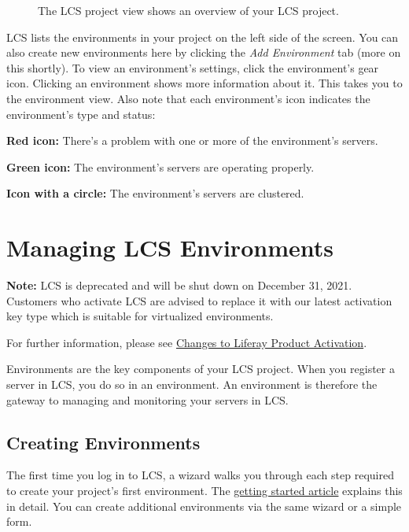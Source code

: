 \begin{figure}
\centering
{}
\caption{The LCS project view shows an overview of your LCS project.}
\end{figure}

LCS lists the environments in your project on the left side of the
screen. You can also create new environments here by clicking the
\emph{Add Environment} tab (more on this shortly). To view an
environment's settings, click the environment's gear icon. Clicking an
environment shows more information about it. This takes you to the
environment view. Also note that each environment's icon indicates the
environment's type and status:

\textbf{Red icon:} There's a problem with one or more of the
environment's servers.

\textbf{Green icon:} The environment's servers are operating properly.

\textbf{Icon with a circle:} The environment's servers are clustered.

\chapter{Managing LCS Environments}\label{managing-lcs-environments}

\noindent\hrulefill

\textbf{Note:} LCS is deprecated and will be shut down on December 31,
2021. Customers who activate LCS are advised to replace it with our
latest activation key type which is suitable for virtualized
environments.

For further information, please see
\href{https://help.liferay.com/hc/en-us/articles/4402347960845-Changes-to-Liferay-Product-Activation}{Changes
to Liferay Product Activation}.

\noindent\hrulefill

Environments are the key components of your LCS project. When you
register a server in LCS, you do so in an environment. An environment is
therefore the gateway to managing and monitoring your servers in LCS.

\section{Creating Environments}\label{creating-environments}

The first time you log in to LCS, a wizard walks you through each step
required to create your project's first environment. The
\href{/docs/7-2/deploy/-/knowledge_base/d/getting-started-with-lcs}{getting
started article} explains this in detail. You can create additional
environments via the same wizard or a simple form.


